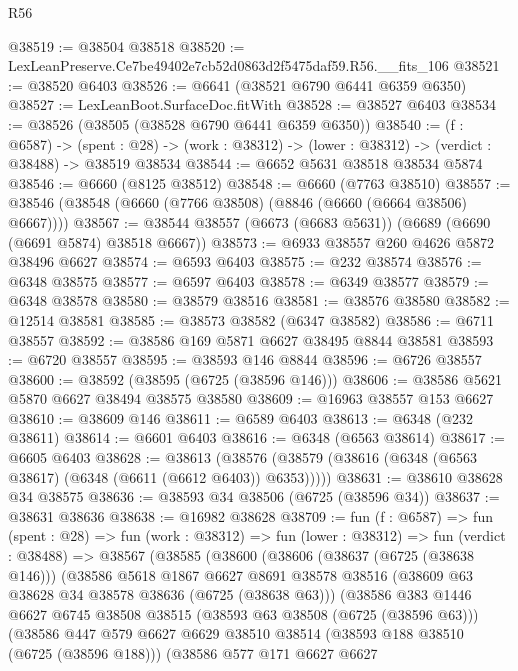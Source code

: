 \begin{lexlean}{R56}
\begin{coremodule}
@38519 := @38504 @38518
@38520 := LexLeanPreserve.Ce7be49402e7cb52d0863d2f5475daf59.R56.__fits_106
@38521 := @38520 @6403
@38526 := @6641 (@38521 @6790 @6441 @6359 @6350)
@38527 := LexLeanBoot.SurfaceDoc.fitWith
@38528 := @38527 @6403
@38534 := @38526 (@38505 (@38528 @6790 @6441 @6359 @6350))
@38540 := (f : @6587) ->
  (spent : @28) -> (work : @38312) -> (lower : @38312) -> (verdict : @38488) -> @38519 @38534
@38544 := @6652 @5631 @38518 @38534 @5874
@38546 := @6660 (@8125 @38512)
@38548 := @6660 (@7763 @38510)
@38557 := @38546 (@38548 (@6660 (@7766 @38508) (@8846 (@6660 (@6664 @38506) @6667))))
@38567 := @38544 @38557 (@6673 (@6683 @5631)) (@6689 (@6690 (@6691 @5874) @38518 @6667))
@38573 := @6933 @38557 @260 @4626 @5872 @38496 @6627
@38574 := @6593 @6403
@38575 := @232 @38574
@38576 := @6348 @38575
@38577 := @6597 @6403
@38578 := @6349 @38577
@38579 := @6348 @38578
@38580 := @38579 @38516
@38581 := @38576 @38580
@38582 := @12514 @38581
@38585 := @38573 @38582 (@6347 @38582)
@38586 := @6711 @38557
@38592 := @38586 @169 @5871 @6627 @38495 @8844 @38581
@38593 := @6720 @38557
@38595 := @38593 @146 @8844
@38596 := @6726 @38557
@38600 := @38592 (@38595 (@6725 (@38596 @146)))
@38606 := @38586 @5621 @5870 @6627 @38494 @38575 @38580
@38609 := @16963 @38557 @153 @6627
@38610 := @38609 @146
@38611 := @6589 @6403
@38613 := @6348 (@232 @38611)
@38614 := @6601 @6403
@38616 := @6348 (@6563 @38614)
@38617 := @6605 @6403
@38628 := @38613
    (@38576 (@38579 (@38616 (@6348 (@6563 @38617) (@6348 (@6611 (@6612 @6403)) @6353)))))
@38631 := @38610 @38628 @34 @38575
@38636 := @38593 @34 @38506 (@6725 (@38596 @34))
@38637 := @38631 @38636
@38638 := @16982 @38628
@38709 := fun (f : @6587) =>
  fun (spent : @28) =>
  fun (work : @38312) =>
  fun (lower : @38312) =>
  fun (verdict : @38488) =>
  @38567
    (@38585
      (@38600
        (@38606
          (@38637 (@6725 (@38638 @146)))
          (@38586
            @5618
            @1867
            @6627
            @8691
            @38578
            @38516
            (@38609 @63 @38628 @34 @38578 @38636 (@6725 (@38638 @63)))
            (@38586
              @383
              @1446
              @6627
              @6745
              @38508
              @38515
              (@38593 @63 @38508 (@6725 (@38596 @63)))
              (@38586
                @447
                @579
                @6627
                @6629
                @38510
                @38514
                (@38593 @188 @38510 (@6725 (@38596 @188)))
                (@38586
                  @577
                  @171
                  @6627
                  @6627

\end{coremodule}
\end{lexlean}
